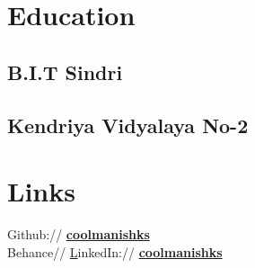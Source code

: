 \documentclass[a4paper]{deedy-resume} %
\begin{document}
\begin{minipage}[t]{0.33\textwidth} %


\section{Education} 

\subsection{B.I.T Sindri}


\sectionspace %


\sectionspace %


\subsection{Kendriya Vidyalaya No-2}


\sectionspace %


\section{Links} 

Github:// \href{https://github.com/coolmanishks}{\bf coolmanishks} \\
Behance// \href{}
LinkedIn:// \href{https://www.linkedin.com/coolmanishks}{\bf coolmanishks} \\



\end{minipage}
\end{document}
